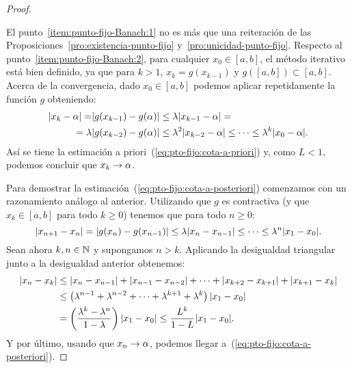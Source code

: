 \begin{proof}~\par
  El punto~\ref{item:punto-fijo-Banach:1} no es más que una
  reiteración de las Proposiciones~\ref{pro:existencia-punto-fijo}
  y~\ref{pro:unicidad-punto-fijo}.  Respecto al
  punto~\ref{item:punto-fijo-Banach:2}, para cualquier $x_0\in [a,b]$,
  el método iterativo está bien definido, ya que para $k>1$,
  $x_{k}=g(x_{k-1})$ y $g([a,b])\subset [a,b]$.
  Acerca de la convergencia, dado $x_0\in
  [a,b]$ podemos aplicar repetidamente la función $g$ obteniendo:
  \begin{equation}
  \begin{aligned}
    |x_k-\alpha| = &|g(x_{k-1})-g(\alpha)| \le \lambda
    |x_{k-1}-\alpha| = \\
    = \lambda &|g(x_{k-2})-g(\alpha)| \le \lambda^2 
    |x_{k-2}-\alpha| \le \cdots \le \lambda^k |x_0-\alpha|.
  \end{aligned}\label{eq:1}  
\end{equation}
  Así se tiene la estimación a
  priori~(\ref{eq:pto-fijo:cota-a-priori}) y, como
  $L<1$, podemos concluir que $x_k\to\alpha$.

  Para demostrar la estimación~(\ref{eq:pto-fijo:cota-a-posteriori})
  comenzamos con un razonamiento análogo al anterior. Utilizando que
  $g$ es contractiva (y que $x_k\in [a,b]$ para todo $k\ge 0$) tenemos
  que para todo $n \ge 0$:
  \begin{equation*}
    |x_{n+1}-x_{n}| =
    |g(x_{n})-g(x_{n-1})|\le\lambda|x_{n}-x_{n-1}| \le \cdots \le \lambda^n|x_1-x_0|.
  \end{equation*}
  Sean ahora $k,n\in\operatorname{{\mathbb N}}$ y supongamos $n>k$. Aplicando la
  desigualdad triangular junto a la desigualdad anterior obtenemos:
  \begin{align*}
     |x_n-x_k| &\le |x_n-x_{n-1}| + |x_{n-1}-x_{n-2}| + \cdots +
     |x_{k+2}-x_{k+1}| + |x_{k+1}-x_{k}|
     \\
     &\le \left(\lambda^{n-1} + \lambda^{n-2} +\cdots+
       \lambda^{k+1} + \lambda^{k} \right) |x_1-x_0|
     \\
     &=\left(\frac{\lambda^k-\lambda^n}{1-\lambda}\right)
     |x_1-x_0| 
     \le \frac{L^k}{1-L} |x_1-x_0|.
  \end{align*}
  Y por último, usando que $x_n\to\alpha$,
  podemos llegar a~(\ref{eq:pto-fijo:cota-a-posteriori}).
\end{proof}

